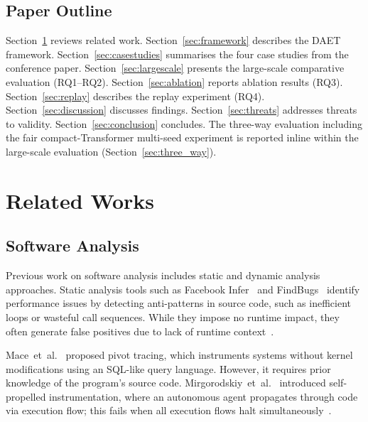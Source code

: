 \documentclass[pdflatex,sn-nature]{sn-jnl}
\theoremstyle{thmstyleone}%
\begin{document}
\subsection{Paper Outline}\label{sec:intro:outline}

Section~\ref{sec:related} reviews related work.
Section~\ref{sec:framework} describes the DAET framework.
Section~\ref{sec:casestudies} summarises the four case studies from the
conference paper.
Section~\ref{sec:largescale} presents the large-scale comparative evaluation
(RQ1--RQ2).
Section~\ref{sec:ablation} reports ablation results (RQ3).
Section~\ref{sec:replay} describes the replay experiment (RQ4).
Section~\ref{sec:discussion} discusses findings.
Section~\ref{sec:threats} addresses threats to validity.
Section~\ref{sec:conclusion} concludes.
The three-way evaluation including the fair compact-Transformer multi-seed
experiment is reported inline within the large-scale evaluation
(Section~\ref{sec:three_way}).

\section{Related Works}\label{sec:related}

\subsection{Software Analysis}
Previous work on software analysis includes static and dynamic analysis
approaches.
Static analysis tools such as Facebook Infer~\cite{calcagno2015moving}
and FindBugs~\cite{hovemeyer2004finding}
identify performance issues by detecting anti-patterns in source code, such
as inefficient loops or wasteful call sequences.
While they impose no runtime impact, they often generate false positives due
to lack of runtime context~\cite{jin2012understanding,nistor2015caramel,dai2018hytrace}.

Mace~et~al.~\cite{mace2015pivot} proposed pivot tracing, which instruments
systems without kernel modifications using an SQL-like query language.
However, it requires prior knowledge of the program's source code.
Mirgorodskiy~et~al.~\cite{mirgorodskiy2006automated} introduced self-propelled
instrumentation, where an autonomous agent propagates through code via execution
flow; this fails when all execution flows halt simultaneously~\cite{jin2012understanding}.
\end{document}
